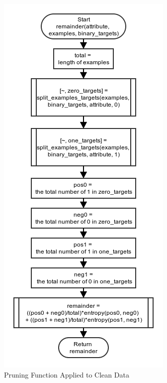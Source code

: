 \documentclass[11pt,a4paper]{article}
\begin{document}
\begin{figure}[p]
		\includegraphics[width=\textwidth, height=\textheight]{images/flow_chart/remainder.png}
     	\caption{Pruning Function Applied to Clean Data}
     	\label{fig:pruningClean}
\end{figure}
\end{document}
